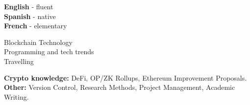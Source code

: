 \documentclass[9pt]{developercv} %
\begin{document}
\begin{minipage}[t]{0.3\textwidth}
	\vspace{-\baselineskip} %

	
	\textbf{English} - fluent\\
	\textbf{Spanish} - native\\
	\textbf{French} - elementary
\end{minipage}
\hfill
\begin{minipage}[t]{0.3\textwidth}
	\vspace{-\baselineskip} %
	
 
    Blockchain Technology\\
    Programming and tech trends \\
    Travelling
    
\end{minipage}
\hfill
\begin{minipage}[t]{0.3\textwidth}
	\vspace{-\baselineskip} %
	

    \textbf{Crypto knowledge:} DeFi, OP/ZK Rollups, Ethereum Improvement Proposals.
    \textbf{Other:} Version Control, Research Methods, Project Management, Academic Writing.
\end{minipage}

\end{document}
